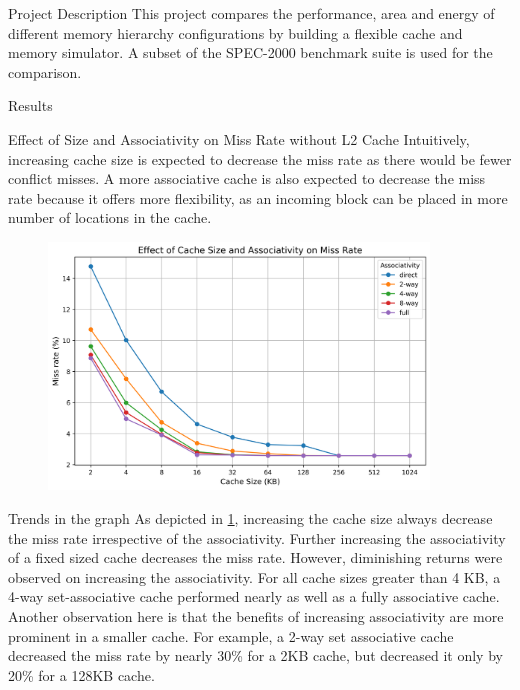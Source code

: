 
\begin{section}{Project Description}
This project compares the performance, area and energy of different memory hierarchy configurations by building a flexible cache and memory simulator. A subset of the SPEC-2000 benchmark suite is used for the comparison.
\end{section}


\begin{section}{Results}

    \begin{subsection}{Effect of Size and Associativity on Miss Rate without L2 Cache}
    Intuitively, increasing cache size is expected to decrease the miss rate as there would be fewer conflict misses. A more associative cache is also expected to decrease the miss rate because it offers more flexibility, as an incoming block can be placed in more number of locations in the cache.

    \begin{figure}[h!]
        \includegraphics[width=0.9\textwidth]{figures/fig1/fig1.png}
        \centering
        \label{fig:fig1}
    \end{figure}

    \begin{subsubsection}{Trends in the graph}
    As depicted in \ref{fig:fig1}, increasing the cache size always decrease the miss rate irrespective of the associativity. Further increasing the  associativity of a fixed sized cache decreases the miss rate. However, diminishing returns were observed on increasing the associativity. For all cache sizes greater than 4 KB, a 4-way set-associative cache performed nearly as well as a fully associative cache. Another observation here is that the benefits of increasing associativity are more prominent in a smaller cache. For example, a 2-way set associative cache decreased the miss rate by nearly 30\% for a 2KB cache, but decreased it only by 20\% for a 128KB cache.
    \end{subsubsection}


\end{subsection}
\end{section}
